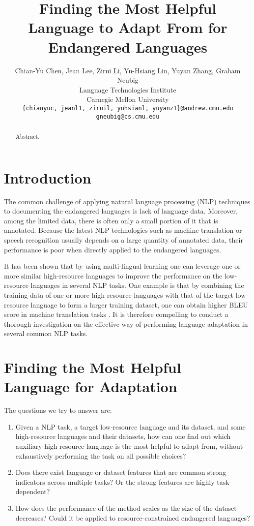 \documentclass[11pt,a4paper,usenames,dvipsnames]{article}
\title{Finding the Most Helpful Language to Adapt From for Endangered Languages}
\author{Chian-Yu Chen, Jean Lee, Zirui Li, Yu-Hsiang Lin, Yuyan Zhang, Graham Neubig \\
  Language Technologies Institute \\
  Carnegie Mellon University \\
  {\tt \{chianyuc, jeanl1, ziruil, yuhsianl, yuyanz1\}@andrew.cmu.edu} \\
  {\tt gneubig@cs.cmu.edu} \\}
\date{}
\begin{document}
\maketitle
\begin{abstract}
{\color{blue}Abstract.}
\end{abstract}

\section{Introduction}

The common challenge of applying natural language processing (NLP) techniques to documenting the endangered languages is lack of language data. Moreover, among the limited data, there is often only a small portion of it that is annotated. Because the latest NLP technologies such as machine translation or speech recognition usually depends on a large quantity of annotated data, their performance is poor when directly applied to the endangered languages.

It has been shown that by using multi-lingual learning one can leverage one or more similar high-resource languages to improve the performance on the low-resource languages in several NLP tasks. One example is that by combining the training data of one or more high-resource languages with that of the target low-resource language to form a larger training dataset, one can obtain higher BLEU score in machine translation tasks \citep{Neubig2018}. It is therefore compelling to conduct a thorough investigation on the effective way of performing language adaptation in several common NLP tasks.


\section{Finding the Most Helpful Language for Adaptation}

The questions we try to answer are:

\begin{enumerate}

\item Given a NLP task, a target low-resource language and its dataset, and some high-resource languages and their datasets, how can one find out which auxiliary high-resource language is the most helpful to adapt from, without exhaustively performing the task on all possible choices?

\item Does there exist language or dataset features that are common strong indicators across multiple tasks? Or the strong features are highly task-dependent?

\item How does the performance of the method scales as the size of the dataset decreases? Could it be applied to resource-constrained endangered languages?

\end{enumerate}
\end{document}
